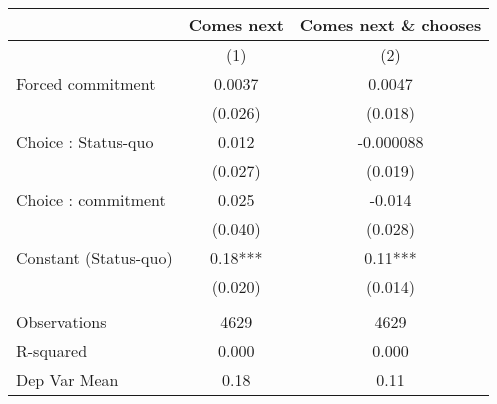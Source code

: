 \begin{tabular}{lcc}
\toprule
      & Comes next & Comes next \& chooses \\
\midrule
\midrule
      & (1)   & (2) \\
\midrule
\midrule
Forced commitment & 0.0037 & 0.0047 \\
      & (0.026) & (0.018) \\
Choice : Status-quo & 0.012 & -0.000088 \\
      & (0.027) & (0.019) \\
Choice : commitment & 0.025 & -0.014 \\
      & (0.040) & (0.028) \\
Constant (Status-quo) & 0.18*** & 0.11*** \\
      & (0.020) & (0.014) \\
      &       &  \\
\midrule
Observations & 4629  & 4629 \\
R-squared & 0.000 & 0.000 \\
Dep Var Mean & 0.18  & 0.11 \\
\bottomrule
\bottomrule
\end{tabular}%
